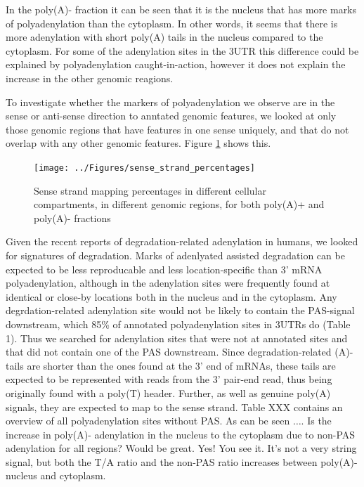 \documentclass[a4paper]{article}
\begin{document}
In the poly(A)- fraction it can be seen that it is the nucleus that has more
marks of polyadenylation than the cytoplasm. In other words, it seems that
there is more adenylation with short poly(A) tails in the nucleus compared to
the cytoplasm. For some of the adenylation sites in the 3UTR this difference
could be explained by polyadenylation caught-in-action, however it does not
explain the increase in the other genomic reagions.

To investigate whether the markers of polyadenylation we observe are in the
sense or anti-sense direction to anntated genomic features, we looked at only
those genomic regions that have features in one sense uniquely, and that do not
overlap with any other genomic features. Figure \ref{fig:sense} shows this.
\begin{figure}[h]
	\centering
		\texttt{[image: ../Figures/sense\_strand\_percentages]}
	\caption{Sense strand mapping percentages in different cellular compartments, in
	different genomic regions, for both poly(A)+ and poly(A)- fractions}
	\label{fig:sense}
\end{figure}

Given the recent reports of degradation-related adenylation in humans, we
looked for signatures of degradation. Marks of adenlyated assisted degradation
can be expected to be less reproducable and less location-specific than 3' mRNA
polyadenylation, although in \cite{} the adenylation sites were frequently
found at identical or close-by locations both in the nucleus and in the
cytoplasm. Any degrdation-related adenylation site would not be likely to
contain the PAS-signal downstream, which 85\% of annotated polyadenylation
sites in 3UTRs do (Table 1). Thus we searched for adenylation sites that were
not at annotated sites and that did not contain one of the PAS downstream.
Since degradation-related (A)-tails are shorter than the ones found at the 3'
end of mRNAs, these tails are expected to be represented with reads from the 3'
pair-end read, thus being originally found with a poly(T) header. Further, as
well as genuine poly(A) signals, they are expected to map to the sense strand.
Table XXX contains an overview of all polyadenylation sites without PAS. As can
be seen $\dots$. Is the increase in poly(A)- adenylation in the nucleus to the
cytoplasm due to non-PAS adenylation for all regions? Would be great. Yes! You
see it. It's not a very string signal, but both the T/A ratio and the non-PAS
ratio increases between poly(A)- nucleus and cytoplasm.
\end{document}
